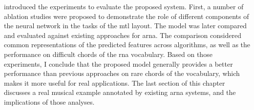  introduced the experiments
to evaluate the proposed system. First, a number of ablation
studies were proposed to demonstrate the role of different
components of the neural network in the tasks of the
\gls{mtl} layout. The model was later compared and evaluated
against existing approaches for \gls{arna}. The comparison
considered common representations of the predicted features
across algorithms, as well as the performance on difficult
chords of the \gls{rna} vocabulary. Based on those
experiments, I conclude that the proposed model generally
provides a better performance than previous approaches on
rare chords of the vocabulary, which makes it more useful
for real applications. The last section of this chapter
discusses a real musical example annotated by existing
\gls{arna} systems, and the implications of those analyses.
